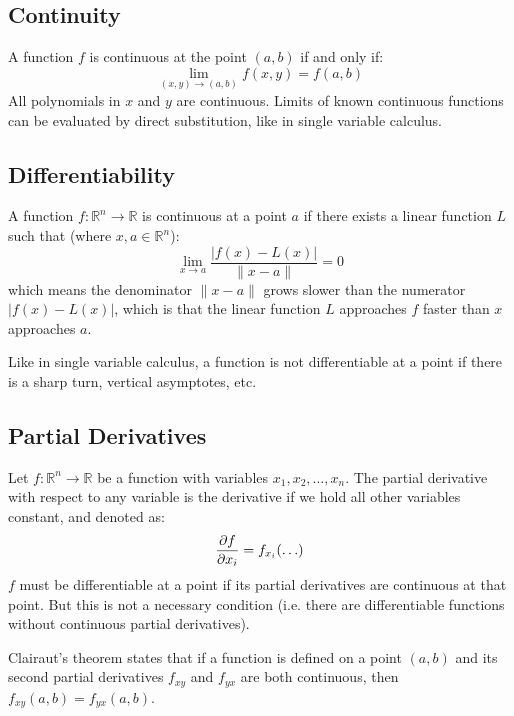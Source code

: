 \documentclass{article}
\begin{document}
\subsection{Continuity}

A function $f$ is continuous at the point $(a,b)$ if and only if:
\begin{equation*}
    \lim_{(x,y)\to(a,b)}f(x,y)=f(a,b)
\end{equation*}
All polynomials in $x$ and $y$ are continuous. Limits of known continuous functions can be evaluated by direct substitution, like in single variable calculus.

\subsection{Differentiability}

A function $f:\mathbb R^n\to\mathbb R$ is continuous at a point $a$ if there exists a linear function $L$ such that (where $x,a\in\mathbb R^n$):
\begin{equation*}
    \lim_{x\to a}\frac{\left|f(x)-L(x)\right|}{\lVert x-a \rVert }=0
\end{equation*}
which means the denominator $\lVert x-a \rVert $ grows slower than the numerator $\left|f(x)-L(x)\right|$, which is that the linear function $L$ approaches $f$ faster than $x$ approaches $a$.

Like in single variable calculus, a function is not differentiable at a point if there is a sharp turn, vertical asymptotes, etc.

\subsection{Partial Derivatives}

Let $f:\mathbb R^n\to\mathbb R$ be a function with variables $x_1,x_2,\ldots,x_n$. The partial derivative with respect to any variable is the derivative if we hold all other variables constant, and denoted as:
\begin{equation*}
	\diffp{f}{x_i}=f_{x_i}(\ldots)
\end{equation*}
$f$ must be differentiable at a point if its partial derivatives are continuous at that point. But this is not a necessary condition (i.e. there are differentiable functions without continuous partial derivatives).

Clairaut's theorem states that if a function is defined on a point $(a,b)$ and its second partial derivatives $f_{xy}$ and $f_{yx}$ are both continuous, then $f_{xy}(a,b)=f_{yx}(a,b)$.
\end{document}
